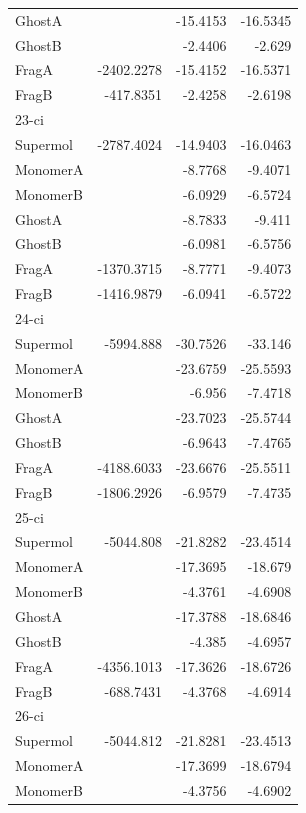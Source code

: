 \documentclass[journal=jctcce,manuscript=article]{achemso}
\begin{document}
\begin{spacing}{1}
\begin{longtable}{lRRR}
    GhostA &       & -15.4153 & -16.5345 \\
    GhostB &       & -2.4406 & -2.629 \\
    FragA & -2402.2278 & -15.4152 & -16.5371 \\
    FragB & -417.8351 & -2.4258 & -2.6198 \\
    23-ci &       &       &  \\
    Supermol & -2787.4024 & -14.9403 & -16.0463 \\
    MonomerA &       & -8.7768 & -9.4071 \\
    MonomerB &       & -6.0929 & -6.5724 \\
    GhostA &       & -8.7833 & -9.411 \\
    GhostB &       & -6.0981 & -6.5756 \\
    FragA & -1370.3715 & -8.7771 & -9.4073 \\
    FragB & -1416.9879 & -6.0941 & -6.5722 \\
    24-ci &       &       &  \\
    Supermol & -5994.888 & -30.7526 & -33.146 \\
    MonomerA &       & -23.6759 & -25.5593 \\
    MonomerB &       & -6.956 & -7.4718 \\
    GhostA &       & -23.7023 & -25.5744 \\
    GhostB &       & -6.9643 & -7.4765 \\
    FragA & -4188.6033 & -23.6676 & -25.5511 \\
    FragB & -1806.2926 & -6.9579 & -7.4735 \\
    25-ci &       &       &  \\
    Supermol & -5044.808 & -21.8282 & -23.4514 \\
    MonomerA &       & -17.3695 & -18.679 \\
    MonomerB &       & -4.3761 & -4.6908 \\
    GhostA &       & -17.3788 & -18.6846 \\
    GhostB &       & -4.385 & -4.6957 \\
    FragA & -4356.1013 & -17.3626 & -18.6726 \\
    FragB & -688.7431 & -4.3768 & -4.6914 \\
    26-ci &       &       &  \\
    Supermol & -5044.812 & -21.8281 & -23.4513 \\
    MonomerA &       & -17.3699 & -18.6794 \\
    MonomerB &       & -4.3756 & -4.6902 \\

\end{longtable}
\end{spacing}
\end{document}
